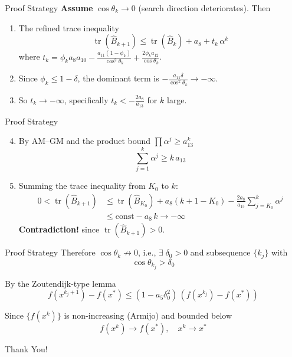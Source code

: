 \documentclass[10pt,aspectratio=169]{beamer}
\DeclareMathOperator{\tr}{tr}
\begin{document}
\begin{frame}{Proof Strategy}
\textbf{Assume} $\cos\theta_k\to 0$ (search direction deteriorates). Then

\medskip
\begin{enumerate}
    \item The refined trace inequality
    $$\tr(\hat{B}_{k+1})\leq \tr(\hat{B}_k) + a_8 + t_k\,\alpha^k$$
    where $t_k = \phi_k a_8 a_{10} - \frac{a_{11}(1-\phi_k)}{\cos^2\theta_k} + \frac{2\phi_k a_{12}}{\cos\theta_k}$.
    \medskip
    \item Since $\phi_k\leq 1-\delta$, the dominant term is $-\frac{a_{11}\delta}{\cos^2\theta_k}\to -\infty$.
    \medskip
    \item So $t_k\to -\infty$, specifically $t_k < -\frac{2a_8}{a_{13}}$ for $k$ large.
\end{enumerate}
\end{frame}

\begin{frame}{Proof Strategy}
\begin{enumerate}
    \setcounter{enumi}{3}
    \item By AM--GM and the product bound $\prod\alpha^j\geq a_{13}^k$
    $$\sum_{j=1}^k \alpha^j \geq k\,a_{13}$$
    \item Summing the trace inequality from $K_0$ to $k$:
    \begin{align*}
        0 < \tr(\hat{B}_{k+1}) &\leq \tr(\hat{B}_{K_0}) + a_8(k+1-K_0) - \frac{2a_8}{a_{13}}\sum_{j=K_0}^k\alpha^j\\
        &\leq \mathrm{const} - a_8\,k \to -\infty
    \end{align*}
    \textbf{Contradiction!} since $\tr(\hat{B}_{k+1})>0$.
\end{enumerate}
\end{frame}

\begin{frame}{Proof Strategy}
Therefore $\cos\theta_k\not\to 0$, i.e., $\exists\;\delta_0>0$ and subsequence $\{k_j\}$ with
$$\cos\theta_{k_j} > \delta_0$$

\medskip
By the Zoutendijk-type lemma
$$f(x^{k_j+1}) - f(x^*) \leq (1-a_5\delta_0^2)\,(f(x^{k_j})-f(x^*))$$

\medskip
Since $\{f(x^k)\}$ is non-increasing (Armijo) and bounded below
$$\boxed{f(x^k)\to f(x^*), \quad x^k\to x^*}$$
\end{frame}

\begin{frame}
\centering
\Huge Thank You!
\end{frame}
\end{document}
